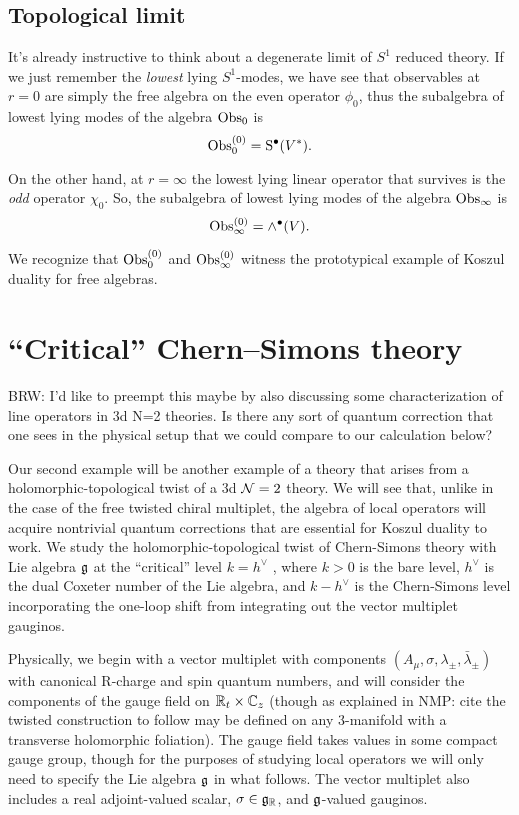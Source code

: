 \documentclass[11pt]{amsart}
\def\brian#1{{\textcolor{blue!65!red}{BRW: {#1}}}}
\def\natalie#1{{\textcolor{green!65!black}{NMP: {#1}}}}
\begin{document}
\subsection*{Topological limit}

It's already instructive to think about a degenerate limit of $S^1$ reduced theory. 
If we just remember the {\em lowest} lying $S^1$-modes, we have see that observables at $r=0$ are simply the free algebra on the even operator $\phi_0$, thus the subalgebra of lowest lying modes of the algebra ${\rm Obs}_0$ is
\[
{\rm Obs}_0^{(0)} = {\rm S}^\bullet(V^*).
\]

On the other hand, at $r=\infty$ the lowest lying linear operator that survives is the {\em odd} operator $\chi_0$.
So, the subalgebra of lowest lying modes of the algebra ${\rm Obs}_\infty$ is
\[
{\rm Obs}_\infty^{(0)} = \wedge^\bullet(V) .
\]

We recognize that ${\rm Obs}_0^{(0)}$ and ${\rm Obs}_\infty^{(0)}$ witness the prototypical example of Koszul duality for free algebras. 




\section{``Critical'' Chern--Simons theory}

\brian{I'd like to preempt this maybe by also discussing some characterization of line operators in 3d N=2 theories. 
Is there any sort of quantum correction that one sees in the physical setup that we could compare to our calculation below?}

Our second example will be another example of a theory that arises from a holomorphic-topological twist of a 3d $\mathcal N=2$ theory. We will see that, unlike in the case of the free twisted chiral multiplet, the algebra of local operators will acquire nontrivial quantum corrections that are essential for Koszul duality to work. We study the holomorphic-topological twist of Chern-Simons theory with Lie algebra $\mathfrak g$ at the ``critical'' level $k = h^{\vee}$ , where $k > 0$ is the bare level, $h^{\vee}$ is the dual Coxeter number of the Lie algebra, and $k - h^{\vee}$ is the Chern-Simons level incorporating the one-loop shift from integrating out the vector multiplet gauginos. 

Physically, we begin with a vector multiplet with components $(A_{\mu}, \sigma, \lambda_{\pm}, \bar{\lambda}_{\pm})$ with canonical R-charge and spin quantum numbers, and will consider the components of the gauge field on $\mathbb R_t \times \mathbb C_{z}$ (though as explained in \natalie{cite} the twisted construction to follow may be defined on any 3-manifold with a transverse holomorphic foliation). The gauge field takes values in some compact gauge group, though for the purposes of studying local operators we will only need to specify the Lie algebra $\mathfrak g$ in what follows. The vector multiplet also includes a real adjoint-valued scalar, $\sigma \in \mathfrak g_{\mathbb R}$, and $\mathfrak g$-valued gauginos. 
\end{document}
